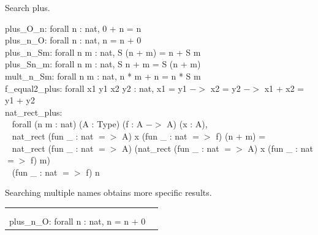 \begin{code}
	Search plus.
\end{code}
\begin{msg}
	plus\_O\_n: forall n : nat, 0 + n = n	\\
	plus\_n\_O: forall n : nat, n = n + 0	\\
	plus\_n\_Sm: forall n m : nat, S (n + m) = n + S m	\\
	plus\_Sn\_m: forall n m : nat, S n + m = S (n + m)	\\
	mult\_n\_Sm: forall n m : nat, n * m + n = n * S m		\\
	f\_equal2\_plus: forall x1 y1 x2 y2 : nat, x1 = y1 $->$ x2 = y2 $->$ x1 + x2 = y1 + y2	\\
	nat\_rect\_plus:	\\ \-\ \quad
	  forall (n m : nat) (A : Type) (f : A $->$ A) (x : A),	\\ \-\ \quad
	  nat\_rect (fun \_ : nat $=>$ A) x (fun \_ : nat $=>$ f) (n + m) =	\\ \-\ \quad
	  nat\_rect (fun \_ : nat $=>$ A) (nat\_rect (fun \_ : nat $=>$ A) x (fun \_ : nat $=>$ f) m)	
	  \\ \-\ \qquad
	    (fun \_ : nat $=>$ f) n
\end{msg}

\noindent 
Searching multiple names obtains more specific results. 

\hspace{-1cm}
\begin{tabular}{p{8cm} p{8cm}}
\begin{code}
	Search plus 0. \\
\end{code}&
\begin{msg}
	plus\_O\_n: forall n : nat, 0 + n = n	\\
	plus\_n\_O: forall n : nat, n = n + 0
\end{msg}
\end{tabular}

